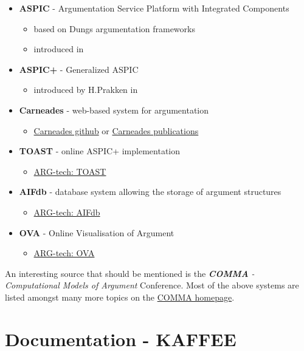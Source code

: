\documentclass[12pt]{report}
\numberwithin{figure}{chapter}
\theoremstyle{break}
\begin{document}
\begin{itemize}
	\item{\textbf{ASPIC} - Argumentation Service Platform with Integrated Components}
	\begin{itemize}
		\item{based on Dungs argumentation frameworks}
		\item{introduced in \cite{ASPIC}}
	\end{itemize}
	\item{\textbf{ASPIC+} - Generalized ASPIC}
	\begin{itemize}
		\item{introduced by H.Prakken in \cite{ASPIC+}}
	\end{itemize}
	\item{\textbf{Carneades} - web-based system for argumentation}
	\begin{itemize}
		\item{\href{https://carneades.github.io/}{Carneades github} or \href{https://carneades.github.io/Publications/}{Carneades publications}}
	\end{itemize}
	\item{\textbf{TOAST} - online ASPIC+ implementation}
	\begin{itemize}
		\item{\href{http://toast.arg-tech.org/snaith-reed-comma12.pdf}{ARG-tech: TOAST}}
	\end{itemize}
	\item{\textbf{AIFdb} - database system allowing the storage of argument structures}
	\begin{itemize}
		\item{\href{http://www.arg-tech.org/index.php/projects/aifbdb-user-guide/}{ARG-tech: AIFdb}}
	\end{itemize}
	\item{\textbf{OVA} - Online Visualisation of Argument}
	\begin{itemize}
		\item{\href{http://www.arg-tech.org/index.php/projects/ova}{ARG-tech: OVA}}
	\end{itemize}
\end{itemize}
\medskip
An interesting source that should be mentioned is the \textit{\textbf{COMMA} - Computational Models of Argument} Conference. Most of the above systems are listed amongst
many more topics on the \href{www.comma-conf.org}{COMMA homepage}.

\chapter{Documentation - KAFFEE}
\end{document}
